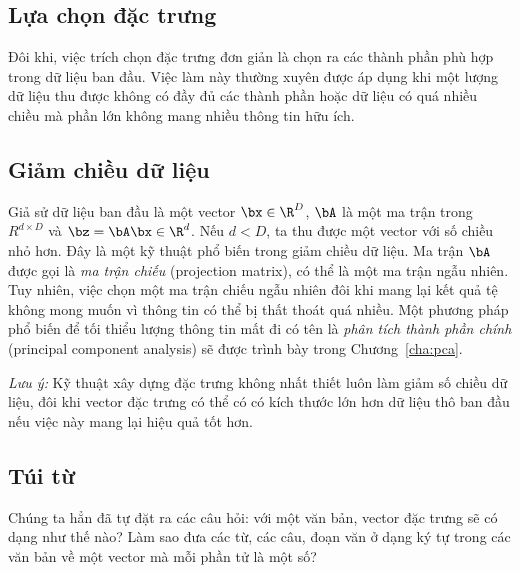 \subsection{Lựa chọn đặc trưng}
Đôi khi, việc trích chọn đặc trưng đơn giản là chọn ra các thành phần phù hợp trong dữ liệu ban đầu. Việc làm này thường xuyên được áp dụng khi một lượng dữ liệu thu được không có đầy đủ các thành phần hoặc dữ liệu có quá nhiều chiều mà phần lớn không mang nhiều thông tin hữu ích. 
 
\subsection{Giảm chiều dữ liệu}
Giả sử dữ liệu ban đầu là một vector $\bx \in \R^D$, $\bA$ là một ma trận trong
$R^{d\times D}$ và $\bz = \bA\bx\in\R^d$. Nếu $d < D$, ta thu được một vector
với số chiều nhỏ hơn. Đây là một kỹ thuật phổ biến trong giảm chiều dữ liệu. Ma
trận $\bA$ được gọi là \textit{ma trận chiếu} (projection matrix), có thể là một ma trận ngẫu nhiên.
Tuy nhiên, việc chọn một ma trận chiếu ngẫu nhiên đôi khi mang lại kết quả tệ
không mong muốn vì thông tin có thể bị thất thoát quá nhiều. Một phương pháp phổ
biến để tối thiểu lượng thông tin mất đi có tên là \textit{phân tích thành phần
chính} ({principal component analysis}) sẽ được trình bày trong
Chương~\ref{cha:pca}.

\textit{Lưu ý:} {Kỹ thuật xây dựng đặc trưng không nhất thiết luôn làm giảm số
chiều dữ liệu, đôi khi vector đặc trưng có thể có có kích thước lớn hơn dữ liệu
thô ban đầu nếu việc này mang lại hiệu quả tốt hơn.}

 
 
\subsection{Túi từ}

Chúng ta hẳn đã tự đặt ra các câu hỏi: với một văn bản, vector đặc trưng sẽ có
dạng như thế nào? Làm sao đưa các từ, các câu, đoạn văn ở dạng ký tự
trong các văn bản về một vector mà mỗi phần tử là một số?
 
